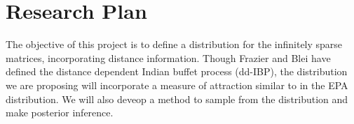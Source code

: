 \chapter{Research Plan}%

The objective of this project is to define a distribution for the infinitely
sparse matrices, incorporating distance information. Though Frazier and Blei
have defined the distance dependent Indian buffet process (dd-IBP), the 
distribution we are proposing will incorporate a measure of attraction similar
to in the EPA distribution. We will also deveop a method to sample from the
distribution and make posterior inference. \\


